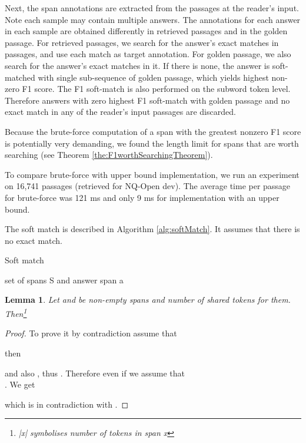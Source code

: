 \documentclass[11pt,a4paper]{article}
\newtheorem{lemma}[theorem]{Lemma}
\begin{document}
Next, the span annotations are extracted from the passages at the reader's input. Note each sample may contain multiple answers. The annotations for each answer in each sample are obtained differently in retrieved passages and in the golden passage. 
For retrieved passages, we search for the answer's exact matches in passages, and use each match as target annotation. 
For golden passage, we also search for the answer's exact matches in it. If there is none, the answer is soft-matched with single sub-sequence of golden passage, which yields highest non-zero F1 score. The F1 soft-match is also performed on the subword token level. Therefore answers with zero highest F1 soft-match with golden passage and no exact match in any of the reader's input passages are discarded.



Because the brute-force computation of a span with the greatest  nonzero F1 score is potentially very demanding, we found the length limit for spans that are worth searching (see Theorem \ref{the:F1worthSearchingTheorem}).

To compare brute-force with upper bound implementation, we run an experiment on 16,741 passages (retrieved for NQ-Open dev). The average time per passage for brute-force was 121 ms and only 9 ms for implementation with an upper bound.

The soft match is described in Algorithm \ref{alg:softMatch}. It assumes that there is no exact match.

\begin{algorithm}
    \caption{Soft match}
    \label{alg:softMatch}
    
    \begin{algorithmic}[1]
    \Require set of spans S and answer span a
        \State 
        \State 
        \State 
        \State 
        
        \While{}
                \State 
                \If{}
                    \State 
                    \State 
                    \State 
                \EndIf
            \EndFor
            \State 
        \EndWhile
    \State \Return 
    \EndFunction
    \end{algorithmic}
\end{algorithm}


\begin{lemma}
\label{lem:upBounIsGreater}
Let  and  be non-empty spans and  number of shared tokens for them. Then\footnote{|x| symbolises number of tokens in span x} 

\end{lemma}
\begin{proof}

To prove it by contradiction assume that

then


and also , thus . Therefore even if we assume that\\. We get


which is in contradiction with .
\end{proof}
\end{document}
